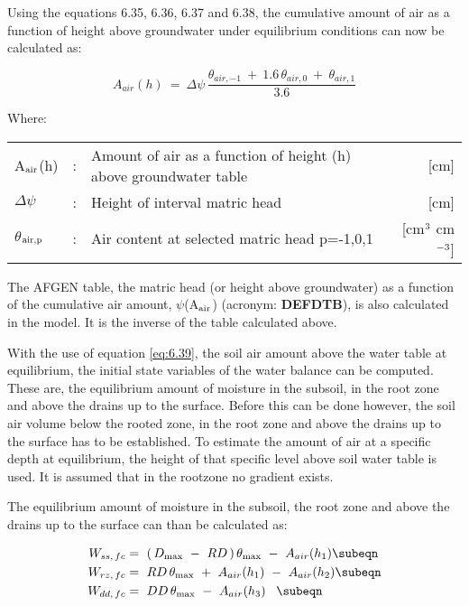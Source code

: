 Using the equations 6.35, 6.36, 6.37 and 6.38, the cumulative amount of air as a function
of height above groundwater under equilibrium conditions can now be calculated as: 

\begin{equation}
\label{eq:6.39}
A_{air} (h) ~=~\Delta  \psi \,{\frac{ \theta_{air, -1} ~+~ 1.6\, \theta_{air,0} ~+~ \theta_{air,1} }{3.6}}
\end{equation}

Where:\\[5pt]
\begin{tabularx}{\textwidth}{llXr}
A$_{{\rm air}}$(h) &:& Amount of air as a function of height (h) above
   groundwater table   & [cm]\\
$\Delta$$\psi$ &:& Height of interval matric head  & [cm]\\
$\theta$$_{{\rm air,p}}$ &:& Air content at selected matric head 
   p=-1,0,1  & [cm$^{{\rm 3}}$ cm$^{{\rm -3}}$]
\end{tabularx}

The AFGEN table, the matric head (or height above groundwater) as a function of the
cumulative air amount, $\psi$(A$_{{\rm air}}$) (acronym: {\bf DEFDTB}), is also calculated in the model. It is
the inverse of the table calculated above.

With the use of equation \ref{eq:6.39}, the soil air amount above the water table at equilibrium,
the initial state variables of the water balance can be computed. These are, the equilibrium 
amount of moisture in the subsoil, in the root zone and above the drains up to the
surface. Before this can be done however, the soil air volume below the rooted zone, in
the root zone and above the drains up to the surface has to be established. To estimate the
amount of air at a specific depth at equilibrium, the height of that specific level above soil
water table is used. It is assumed that in the rootzone no gradient exists. 

The equilibrium amount of moisture in the subsoil, the root zone and above the drains up
to the surface can than be calculated as:

\begin{align}
\label{eq:6.40}
W_{ss,\, fc} &=~ (\, D_{\max} ~-~ RD\, )\, \theta_{\max } ~-~ A_{air} (h_{1} )
    \subeqn  \\
W_{rz,\, fc} &=~ RD\, \theta_{\max } ~+~A_{air} (h_{1} )~-~A_{air} (h_{2} ) 
   \subeqn  \\
W_{dd,\, fc} &=~ DD\, \theta_{\max } ~-~A _{air} (h_{3} )~~\, 
   \subeqn
\end{align}

